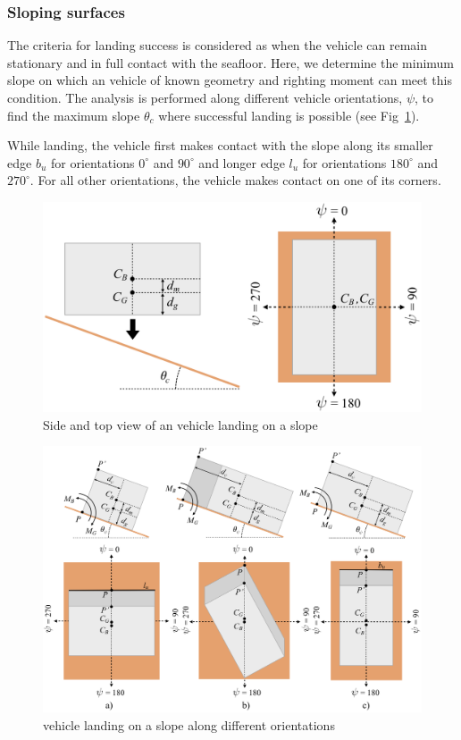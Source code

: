 \subsubsection{Sloping surfaces}

The criteria for landing success is considered as when the vehicle can remain stationary and in full contact with the seafloor. Here, we determine the minimum slope on which an vehicle of known geometry and righting moment can meet this condition. The analysis is performed along different vehicle orientations, $\psi$, to find the maximum slope  $\theta_c$ where successful landing is possible (see Fig~\ref{f:mehul6}). 

While landing, the vehicle first makes contact with the slope along its smaller edge $b_u$ for orientations $0^\circ$ and $90^\circ$ and longer edge $l_u$ for orientations $180^\circ$ and $270^\circ$. For all other orientations, the vehicle makes contact on one of its corners.

\begin{figure}[!ht]
\centering
\includegraphics[width=5in]{./images/mehul6.png}
\caption{Side and top view of an vehicle landing on a slope}
\label{f:mehul6}
\end{figure}

\begin{figure}[!ht]
\centering
\includegraphics[width=7in]{./images/mehul7.png}
\caption{vehicle landing on a slope along different orientations}
\label{f:mehul7}
\end{figure}

